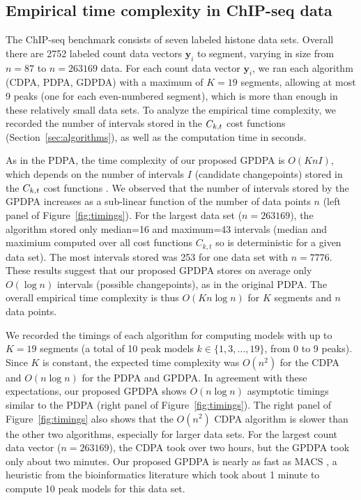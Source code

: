 \documentclass[aoas]{imsart}
\begin{document}
\subsection{Empirical time complexity in ChIP-seq data}
\label{sec:results_time}

The ChIP-seq benchmark consists of seven labeled histone data
sets.
Overall there are 2752 labeled count data vectors $\mathbf y_i$ to segment,
varying in size from $n=87$ to $n=263169$ data. For each count data
vector $\mathbf y_i$, we ran each algorithm (CDPA, PDPA, GDPDA) with a
maximum of $K=19$ segments, allowing at most 9 peaks (one for
each even-numbered segment), which is more than enough in these
relatively small data sets. To analyze the empirical time complexity,
we recorded the number of intervals stored in the $C_{k,t}$ cost
functions (Section~\ref{sec:algorithms}), as well as the computation
time in seconds.


As in the PDPA, the time complexity of our proposed GPDPA is
$O(K n I)$, which depends on the number of intervals $I$ (candidate
changepoints) stored in the $C_{k,t}$ cost functions
\citep{pruned-dp-new}. We observed that the number of intervals stored
by the GPDPA increases as a sub-linear function of the number of data
points $n$ (left panel of Figure~\ref{fig:timings}). For the largest data
set ($n=263169$), the algorithm stored only median=16 and maximum=43
intervals (median and maximium computed over all cost functions
$C_{k,t}$ so is deterministic for a given data set). The most
intervals stored was 253 for one data set with $n=7776$. These results
suggest that our proposed GPDPA stores on average only $O(\log n)$
intervals (possible changepoints), as in the original PDPA. The
overall empirical time complexity is thus $O(K n \log n)$ for $K$
segments and $n$ data points.

We recorded the timings of each algorithm for computing models with up
to $K=19$ segments (a total of 10 peak models $k\in\{1,3,\dots,19\}$,
from 0 to 9 peaks). Since $K$ is constant, the expected time
complexity was $O(n^2)$ for the CDPA and $O(n \log n)$ for the PDPA
and GPDPA. In agreement with these expectations, our proposed GPDPA
shows $O(n\log n)$ asymptotic timings similar to the PDPA (right panel of
Figure~\ref{fig:timings}). 
The right panel of
Figure~\ref{fig:timings} also shows that the $O(n^2)$ CDPA algorithm is slower than the other
two algorithms, especially for larger data sets. For the largest count
data vector ($n=263169$), the CDPA took over two hours, but the GPDPA
took only
about two minutes. Our proposed GPDPA is nearly as fast as MACS
\citep{MACS}, a heuristic from the bioinformatics literature which
took about 1 minute to compute 10 peak models for this data set. 
\end{document}
